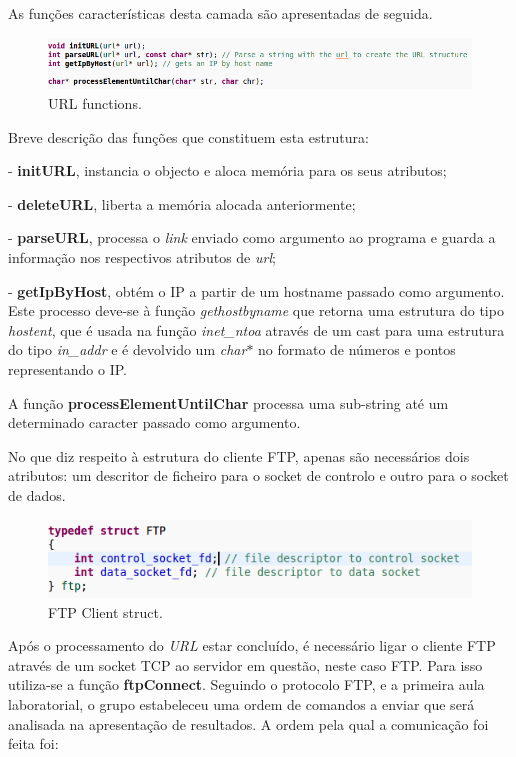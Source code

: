 \documentclass[a4paper]{article}
\begin{document}
As funções características desta camada são apresentadas de seguida.
\pagebreak

\begin{figure}[h!]
\includegraphics[scale=0.5]{res/url-functions.png}
\caption{URL functions.}
\end{figure}

Breve descrição das funções que constituem esta estrutura:

- \textbf{initURL}, instancia o objecto e aloca memória para os seus atributos;

- \textbf{deleteURL}, liberta a memória alocada anteriormente;

- \textbf{parseURL}, processa o \textit{link} enviado como argumento ao programa e guarda a informação nos respectivos atributos de \textit{url};

- \textbf{getIpByHost}, obtém o IP a partir de um hostname passado como argumento. Este processo deve-se à função \textit{gethostbyname} que retorna uma estrutura do tipo \textit{hostent}, que é usada na função \textit{inet\_ntoa} através de um cast para uma estrutura do tipo \textit{in\_addr} e é devolvido um \textit{char$*$} no formato de números e pontos representando o IP.

A função \textbf{processElementUntilChar} processa uma sub-string até um determinado caracter passado como argumento.\linebreak

No que diz respeito à estrutura do cliente FTP, apenas são necessários dois atributos: um descritor de ficheiro para o socket de controlo e outro para o socket de dados.

\begin{figure}[h!]
\includegraphics[scale=0.5]{res/ftp-struct.png}
\caption{FTP Client struct.}
\end{figure}

Após o processamento do \textit{URL} estar concluído, é necessário ligar o cliente FTP através de um socket TCP ao servidor em questão, neste caso FTP. Para isso utiliza-se a função \textbf{ftpConnect}. Seguindo o protocolo FTP, e a primeira aula laboratorial, o grupo estabeleceu uma ordem de comandos a enviar que será analisada na apresentação de resultados. A ordem pela qual a comunicação foi feita foi:
\end{document}
